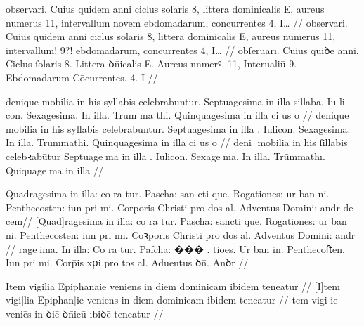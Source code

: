 \ex \bg
\gla
{}
observari. Cuius quidem 
anni ciclus solaris 8, littera dominicalis 
E, aureus numerus 11, intervallum novem {} ebdomadarum, concurrentes 4, 
{I\ldots} {} {}
//
\glRekonstrukcja
{}
observari. Cuius quidem {}
anni ciclus solaris 8, littera dominicalis 
E, aureus numerus 11, intervallum! {} {9?!} ebdomadarum, concurrentes 4, 
{I\ldots} {} {}
//
\glU
{}
obſeruarı. Cuius quiꝺē {} anni. Ciclus ſolaris 8. Littera ꝺn̄icalis E. Aureus nnmerꝰ. 11, Interualiū {} {9}. Ebdomadarum Cōcurrentes. 4. I {} {}
//
\endgl
\xe


\ex \bg
\gla
{}
denique mobilia in his syllabis celebrabuntur. Septuagesima in illa sillaba. {Iu li con}.
Sexagesima. In illa. {Trum ma thi}. Quinquagesima in illa {ci us o}
{} {} {} {}
//
\glRekonstrukcja
{}
denique mobilia in his syllabis celebrabuntur. Septuagesima in illa {}.  Iulicon.
Sexagesima. In illa. Trummathi. Quinquagesima in illa {ci us o}
{} {} {} {}
//
\glU
{}
deni mobilia in his ſillabis celebꝛabūtur Septuagema in illa {}.  Iulicon. Sexagema. In illa. Trūmmathı. Quiquagema in illa
//
\endgl
\xe



\ex \bg
\gla
{}
Quadragesima in illa: co ra tur. Pascha: {san cti} 
que. Rogationes: ur ban ni. Penthecosten: iun pri mi. Corporis Christi pro dos al. Adventus Domini: andr
{de cem}//
\glRekonstrukcja
{}
[Quad]ragesima in illa: co ra tur. Pascha: {sancti} 
que. Rogationes: ur ban ni. Penthecosten: iun pri mi. Coꝛporis Christi pro dos al. Adventus Domini: andr
{} {}
//
\glU
{}
rageima. In illa: Co ra tur. Paſcha: ��� . tiōes. Ur ban in. Penthecoﬅen. Iun pri mi. Corp̄is xꝑi pro tos al. Aduentus ꝺn̄. Anꝺr
//
\endgl
\xe



\ex \bg
\gla
{}
Item
vigilia Epiphanaie veniens
in diem dominicam ibidem 
teneatur
//
\glRekonstrukcja
{}
[I]tem
vigi[lia Epiphan]ie veniens
in diem dominicam ibidem 
teneatur
//
\glU
{}
tem vigi ie veniēs in ꝺiē ꝺn̄icū ıbiꝺē teneatur
//
\endgl
\xe



